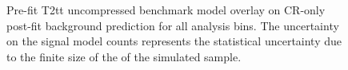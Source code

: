 \begin{figure}[h!]
\begin{center}
{            \label{fig:T2tt_uncompressed_MR_4j}
        } \\
         ~~
         \\
        \caption{
            Pre-fit T2tt uncompressed benchmark model overlay on CR-only
            post-fit background prediction for all analysis bins. The
            uncertainty on the signal model counts represents the statistical
            uncertainty due to the finite size of the of the simulated sample.
        }
        \label{fig:T2tt_uncompressed_MR}
    \end{center}
\end{figure}

